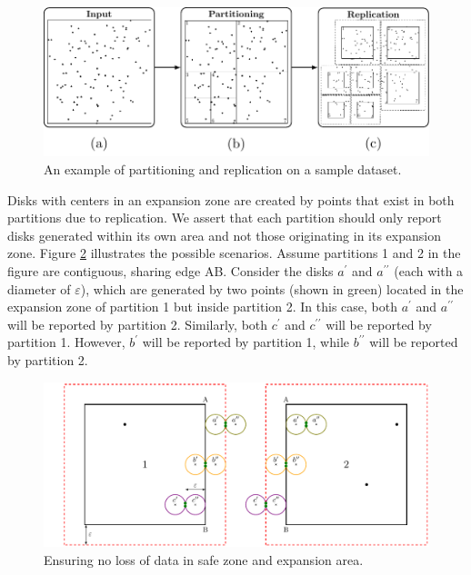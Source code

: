 \begin{figure}
    \centering
    \includegraphics[width=\linewidth]{pflocks_paper/figures/PartReplication/P123}
    \caption{An example of partitioning and replication on a sample dataset.}\label{fig:partrep}
\end{figure}

Disks with centers in an expansion zone are created by points that exist in both partitions due to replication. We assert that each partition should only report disks generated within its own area and not those originating in its expansion zone. Figure \ref{fig:ensuring} illustrates the possible scenarios. Assume partitions 1 and 2 in the figure are contiguous, sharing edge AB. Consider the disks $a^\prime$ and $a^{\prime\prime}$ (each with a diameter of $\varepsilon$), which are generated by two points (shown in green) located in the expansion zone of partition 1 but inside partition 2. In this case, both $a^\prime$ and $a^{\prime\prime}$ will be reported by partition 2. Similarly, both $c^\prime$ and $c^{\prime\prime}$ will be reported by partition 1. However, $b^\prime$ will be reported by partition 1, while $b^{\prime\prime}$ will be reported by partition 2.

\begin{figure}
    \centering
    \includegraphics[width=\linewidth]{pflocks_paper/figures/merge.pdf}
    \caption{Ensuring no loss of data in safe zone and expansion area.}\label{fig:ensuring}
\end{figure}

